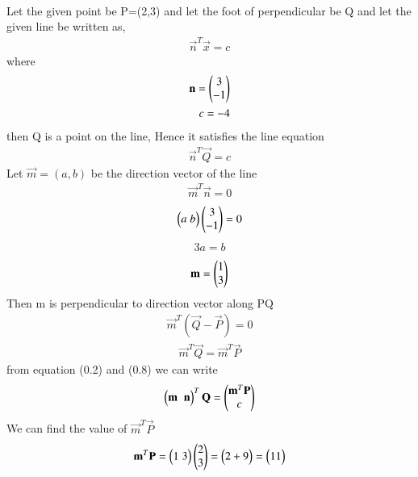 \documentclass[journal]{IEEEtran}
\begin{document}
         \solution \\
         Let the given point be P=(2,3) and let the foot of perpendicular be Q and let the given line be written as,
         \begin{align}
             \vec{n}^T\vec{x}=c
         \end{align}
         where\\
         \begin{align*}
             \mathbf{n} = \begin{pmatrix}3\\-1\end{pmatrix} \\ c=-4
         \end{align*}
         then Q is a point on the line, Hence it satisfies the line equation
         \begin{align}
             \vec{n}^T\vec{Q}=c
         \end{align}
         Let $\vec{m}=(a,b)$ be the direction vector of the line 
         \begin{align}
             \vec{m}^T\vec{n}=0
         \end{align}
         \begin{align}
             \begin{pmatrix}a\;b\end{pmatrix}\begin{pmatrix}3\\-1\end{pmatrix}=0
         \end{align}
         \begin{align}
             3a=b
         \end{align}
         \begin{align}
             \mathbf{m}=\begin{pmatrix}1\\3\end{pmatrix}
         \end{align}
         Then m is perpendicular to direction vector along PQ\\
         \begin{align}
             \vec{m}^T(\vec{Q}-\vec{P})=0
         \end{align}
         \begin{align}
             \vec{m}^T\vec{Q}=\vec{m}^T\vec{P}
         \end{align}
         from equation (0.2) and (0.8) we can write 
         \begin{align}
             \begin{pmatrix}\mathbf{m}\;\;\mathbf{n}\end{pmatrix}^T\mathbf{Q}=\begin{pmatrix}\mathbf{m}^T\mathbf{P}\\c\end{pmatrix}
         \end{align}
         We can find the value of $\vec{m}^T\vec{P}$
         \begin{align}
             \mathbf{m}^T\mathbf{P}=\begin{pmatrix}1\;3\end{pmatrix}\begin{pmatrix}2\\3\end{pmatrix}=\begin{pmatrix}2+9\end{pmatrix}=\begin{pmatrix}11\end{pmatrix}
         \end{align}
\end{document}
